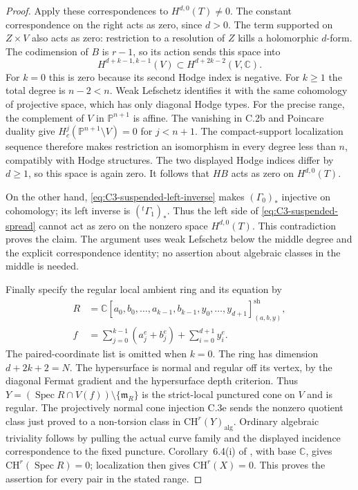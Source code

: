 \begin{proof}
Apply these correspondences to $H^{d,0}(T)\ne0$. The
constant correspondence on the right acts as zero, since
$d>0$. The term supported on $Z\times V$ also acts as
zero: restriction to a resolution of $Z$ kills a
holomorphic $d$-form. The codimension of $B$ is $r-1$,
so its action sends this space into
\[
       H^{d+k-1,k-1}(V)
                   \subset H^{d+2k-2}(V,\mathbb C).
\]
For $k=0$ this is zero because its second Hodge index is
negative. For $k\ge1$ the total degree is $n-2<n$.
Weak Lefschetz identifies it with the same cohomology of
projective space, which has only diagonal Hodge types.
For the precise range, the complement of $V$ in
$\mathbb P^{n+1}$ is affine. The vanishing in C.2b and
Poincare duality give $H_c^j(\mathbb P^{n+1}\setminus V)=0$
for $j<n+1$. The compact-support localization sequence
therefore makes restriction an isomorphism in every degree
less than $n$, compatibly with Hodge structures.
The two displayed Hodge indices differ by $d\ge1$, so
this space is again zero. It follows that $HB$ acts as
zero on $H^{d,0}(T)$.

On the other hand, \eqref{eq:C3-suspended-left-inverse}
makes $(\Gamma_0)_*$ injective on cohomology; its left
inverse is $({}^t\Gamma_1)_*$. Thus the left side of
\eqref{eq:C3-suspended-spread} cannot act as zero on the
nonzero space $H^{d,0}(T)$. This contradiction proves
the claim. The argument uses weak Lefschetz below the
middle degree and the explicit correspondence identity;
no assertion about algebraic classes in the middle is needed.

Finally specify the regular local ambient ring and its
equation by
\[
 \begin{split}
 R&=\mathbb C[a_0,b_0,\ldots,a_{k-1},b_{k-1},
                y_0,\ldots,y_{d+1}]_{(a,b,y)}^{\mathrm{sh}},\\
 f&=\sum_{j=0}^{k-1}(a_j^e+b_j^e)+\sum_{i=0}^{d+1}y_i^e.
 \end{split}
\]
The paired-coordinate list is omitted when $k=0$.
The ring has dimension $d+2k+2=N$. The hypersurface is normal
and regular off its vertex, by the diagonal Fermat
gradient and the hypersurface depth criterion. Thus
$Y=(\operatorname{Spec}R\cap V(f))\setminus\{\mathfrak m_R\}$
is the strict-local punctured cone on $V$ and is regular.
The projectively normal cone injection C.3e sends the
nonzero quotient class just proved to a non-torsion class
in $\mathrm{CH}^{r}(Y)_{\mathrm{alg}}$. Ordinary algebraic
triviality follows by pulling the actual curve family and
the displayed incidence correspondence to the fixed
puncture. Corollary~6.4(i) of \citet[author p.~27]{rootSkalit2017},
with base $\mathbb C$, gives
$\mathrm{CH}^r(\operatorname{Spec}R)=0$; localization then
gives $\mathrm{CH}^r(X)=0$. This proves the assertion for
every pair in the stated range.
\end{proof}

